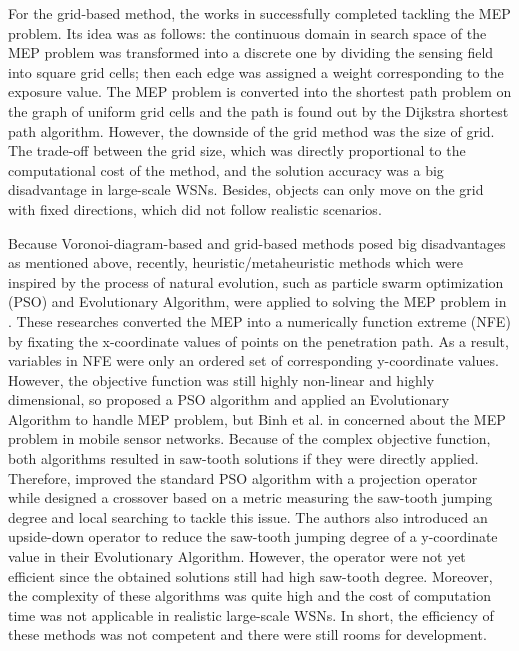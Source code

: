 \documentclass[final]{elsarticle}
\begin{document}
For the grid-based method, the works in \cite{meguerdichian2001exposure, veltri2003minimal,megerian2002exposure, b9, b10} successfully completed tackling the MEP problem. Its idea was as follows: the continuous domain in search space of the MEP problem was transformed into a discrete one by dividing the sensing field into square grid cells; then each edge was assigned a weight corresponding to the exposure value. The MEP problem is converted into the shortest path problem on the graph of uniform grid cells and the path is found out by the Dijkstra shortest path algorithm. However, the downside of the grid method was the size of grid. The trade-off between the grid size, which was directly proportional to the computational cost of the method, and the solution accuracy was a big disadvantage in large-scale WSNs. Besides, objects can only move on the grid with fixed directions, which did not follow realistic scenarios.

Because Voronoi-diagram-based and grid-based methods posed big disadvantages as mentioned above, recently, heuristic/metaheuristic methods which were inspired by the process of natural evolution, such as particle swarm optimization (PSO) and Evolutionary Algorithm, were applied to solving the MEP problem in \cite{b11,b12,b25,binh2019efficient}. These researches converted the MEP into a numerically function extreme (NFE) \cite{b8} by fixating the x-coordinate values of points on the penetration path. As a result, variables in NFE were only an ordered set of corresponding y-coordinate values. However, the objective function was still highly non-linear and highly dimensional, so \cite{b11} proposed a PSO algorithm and \cite {b12,b25,binh2019efficient} applied an Evolutionary Algorithm to handle MEP problem, but Binh et al. in \cite{b25} concerned about the MEP problem in mobile sensor networks. Because of the complex objective function, both algorithms resulted in saw-tooth solutions if they were directly applied. Therefore, \cite{b11} improved the standard PSO algorithm with a projection operator while \cite{binh2019efficient} designed a crossover based on a metric measuring the saw-tooth jumping degree and local searching to tackle this issue. The authors \cite{b12} also introduced an upside-down operator to reduce the saw-tooth jumping degree of a y-coordinate value in their Evolutionary Algorithm. However, the operator were not yet efficient since the obtained solutions still had high saw-tooth degree. Moreover, the complexity of these algorithms was quite high and the cost of computation time was not applicable in realistic large-scale WSNs. In short, the efficiency of these methods was not competent and there were still rooms for development.
\end{document}
